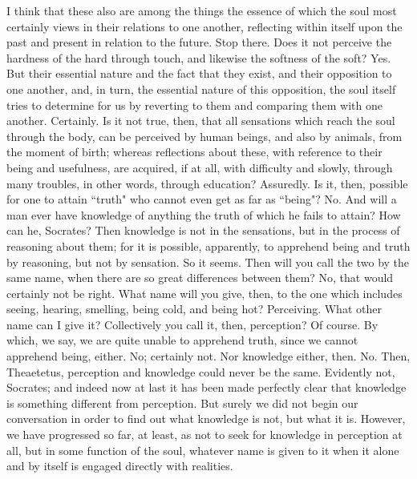 \documentclass[letterpaper,12pt]{article}
\newcommand{\stephpag}[1]{\marginnote{\small\itshape\fontfamily{ppl}\selectfont #1}}
\begin{document}
\begin{drama}
\theaetetusspeaks
I think that these also are among the things the essence of which the soul most certainly views in their relations to one another, reflecting within itself upon the past and present \stephpag{b} in relation to the future.
\socratesspeaks
Stop there. Does it not perceive the hardness of the hard through touch, and likewise the softness of the soft?
\theaetetusspeaks
Yes.
\socratesspeaks
But their essential nature and the fact that they exist, and their opposition to one another, and, in turn, the essential nature of this opposition, the soul itself tries to determine for us by reverting to them and comparing them with one another.
\theaetetusspeaks
Certainly.
\socratesspeaks
Is it not true, then, that all sensations which reach the soul through the body, \stephpag{c} can be perceived by human beings, and also by animals, from the moment of birth; whereas reflections about these, with reference to their being and usefulness, are acquired, if at all, with difficulty and slowly, through many troubles, in other words, through education?
\theaetetusspeaks
Assuredly.
\socratesspeaks
Is it, then, possible for one to attain ``truth" who cannot even get as far as ``being"?
\theaetetusspeaks
No.
\socratesspeaks
And will a man ever have knowledge of anything the truth of which he fails to attain? \stephpag{d}
\theaetetusspeaks
How can he, Socrates?
\socratesspeaks
Then knowledge is not in the sensations, but in the process of reasoning about them; for it is possible, apparently, to apprehend being and truth by reasoning, but not by sensation.
\theaetetusspeaks
So it seems.
\socratesspeaks
Then will you call the two by the same name, when there are so great differences between them?
\theaetetusspeaks
No, that would certainly not be right.
\socratesspeaks
What name will you give, then, to the one which includes seeing, hearing, smelling, being cold, and being hot? \stephpag{e}
\theaetetusspeaks
Perceiving. What other name can I give it?
\socratesspeaks
Collectively you call it, then, perception?
\theaetetusspeaks
Of course.
\socratesspeaks
By which, we say, we are quite unable to apprehend truth, since we cannot apprehend being, either.
\theaetetusspeaks
No; certainly not.
\socratesspeaks
Nor knowledge either, then.
\theaetetusspeaks
No.
\socratesspeaks
Then, Theaetetus, perception and knowledge could never be the same.
\theaetetusspeaks
Evidently not, Socrates; and indeed now at last it has been made perfectly clear that knowledge is something different from perception. \stephpag{187 a}
\socratesspeaks
But surely we did not begin our conversation in order to find out what knowledge is not, but what it is. However, we have progressed so far, at least, as not to seek for knowledge in perception at all, but in some function of the soul, whatever name is given to it when it alone and by itself is engaged directly with realities.

\end{drama}
\end{document}

